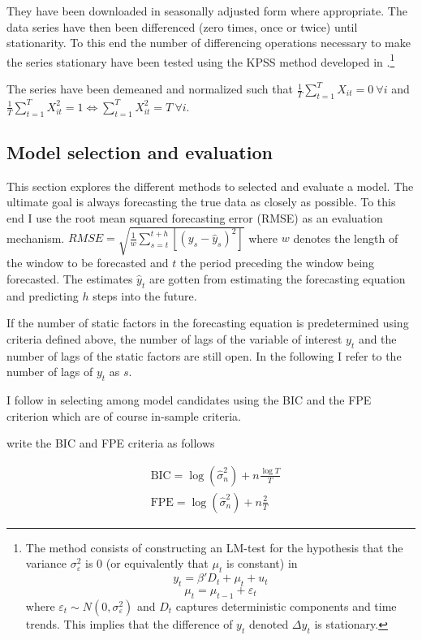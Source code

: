 \documentclass[12pt]{article}
\begin{document}
They have been downloaded in seasonally adjusted form where appropriate. The data series have then been differenced (zero times, once or twice) until stationarity. To this end the number of differencing operations necessary to make the series stationary have been tested using the KPSS method developed in \citet{kwiatkowski1992testing}.\footnote{The method consists of constructing an LM-test for the hypothesis that the variance $\sigma^2_\varepsilon$ is 0 (or equivalently that $\mu_t$ is constant) in $$y_t = \beta'D_t + \mu_t + u_t$$ $$\mu_t = \mu_{t-1} + \varepsilon_t$$ where $\varepsilon_t \sim N(0, \sigma^2_\varepsilon)$ and $D_t$ captures deterministic components and time trends. This implies that the difference of $y_t$ denoted $\Delta y_t$ is stationary.}

The series have been demeaned and normalized such that $\frac{1}{T}\sum_{t=1}^T X_{it} = 0 \ \forall i$ and $\frac{1}{T}\sum_{t=1}^T X_{it}^2 = 1 \Leftrightarrow \sum_{t=1}^T X_{it}^2 = T \ \forall i$. \\


\subsection{Model selection and evaluation}
This section explores the different methods to selected and evaluate a model. The ultimate goal is always forecasting the true data as closely as possible. To this end I use the root mean squared forecasting error (RMSE) as an evaluation mechanism. $RMSE = \sqrt{\frac{1}{w}\sum_{s=t}^{t+h}[(y_s - \hat y_s)^2]}$ where $w$ denotes the length of the window to be forecasted and $t$ the period preceding the window being forecasted. The estimates $\hat y_t$ are gotten from estimating the forecasting equation and predicting $h$ steps into the future.

If the number of static factors in the forecasting equation is predetermined using criteria defined above, the number of lags of the variable of interest $y_t$ and the number of lags of the static factors are still open. In the following I refer to the number of lags of $y_t$ as $s$. 

I follow \citet{bai2008forecasting} in selecting among model candidates using the BIC and the FPE criterion which are of course in-sample criteria. 

\citet{bai2008forecasting} write the BIC and FPE criteria as follows

\begin{equation}
\label{information criteria}
\begin{split}
	& \text{BIC} = \log(\hat \sigma_n^2) + n \frac{\log T}{T} \\ 
	& \text{FPE} = \log(\hat \sigma_n^2) + n \frac{2}{T}
\end{split}
\end{equation}
\end{document}

